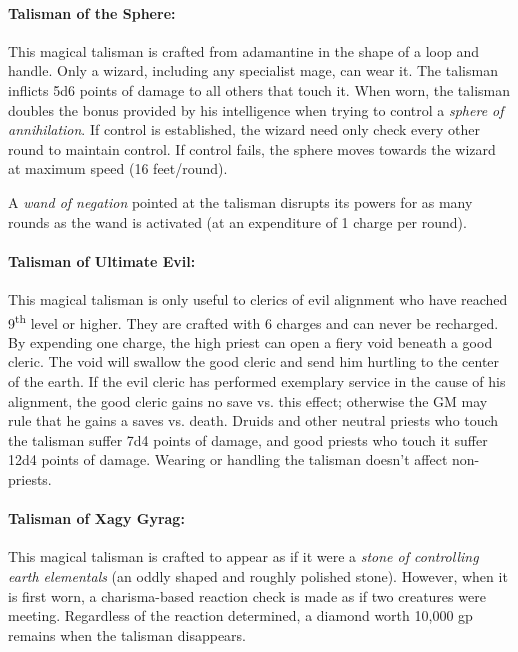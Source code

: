 \begin{multicols}{2}
\paragraph{Talisman of the Sphere:} This magical talisman is crafted from adamantine in the shape of a loop and handle.  Only a wizard, including any specialist mage, can wear it.  The talisman inflicts 5d6 points of damage to all others that touch it.  When worn, the talisman doubles the bonus provided by his intelligence when trying to control a \textit{sphere of annihilation}.  If control is established, the wizard need only check every other round to maintain control.  If control fails, the sphere moves towards the wizard at maximum speed (16 feet/round).

A \textit{wand of negation} pointed at the talisman disrupts its powers for as many rounds as the wand is activated (at an expenditure of 1 charge per round).

\paragraph{Talisman of Ultimate Evil:} This magical talisman is only useful to clerics of evil alignment who have reached 9\textsuperscript{th} level or higher.  They are crafted with 6 charges and can never be recharged.  By expending one charge, the high priest can open a fiery void beneath a good cleric.  The void will swallow the good cleric and send him hurtling to the center of the earth.  If the evil cleric has performed exemplary service in the cause of his alignment, the good cleric gains no save vs. this effect; otherwise the GM may rule that he gains a saves vs. death.  Druids and other neutral priests who touch the talisman suffer 7d4 points of damage, and good priests who touch it suffer 12d4 points of damage.  Wearing or handling the talisman doesn't affect non-priests.

\paragraph{Talisman of Xagy Gyrag:} This magical talisman is crafted to appear as if it were a \textit{stone of controlling earth elementals} (an oddly shaped and roughly polished stone).  However, when it is first worn, a charisma-based reaction check is made as if two creatures were meeting.  Regardless of the reaction determined, a diamond worth 10,000 gp remains when the talisman disappears.


\end{multicols}
